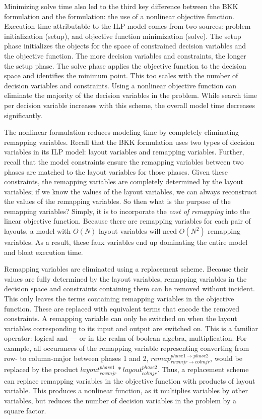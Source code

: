 Minimizing solve time also led to the third key difference between the BKK formulation and the \FormatDecisions{} formulation: the use of a nonlinear objective function.
Execution time attributable to the ILP model comes from two sources: problem initialization (setup), and objective function minimization (solve).
The setup phase initializes the objects for the space of constrained decision variables and the objective function.
The more decision variables and constraints, the longer the setup phase.
The solve phase applies the objective function to the decision space and identifies the minimum point.
This too scales with the number of decision variables and constraints.
Using a nonlinear objective function can eliminate the majority of the decision variables in the problem.
While search time per decision variable increases with this scheme, the overall model time decreases significantly.

The nonlinear formulation reduces modeling time by completely eliminating remapping variables.
Recall that the BKK formulation uses two types of decision variables in its ILP model: layout variables and remapping variables.
Further, recall that the model constraints ensure the remapping variables between two phases are matched to the layout variables for those phases.
Given these constraints, the remapping variables are completely determined by the layout variables; 
if we know the values of the layout variables, we can always reconstruct the values of the remapping variables.
So then what is the purpose of the remapping variables? 
Simply, it is to incorporate the \textit{cost of remapping} into the linear objective function.
Because there are remapping variables for each pair of layouts, a model with $O(N)$ layout variables will need $O(N^2)$ remapping variables.
As a result, these faux variables end up dominating the entire model and bloat execution time.

Remapping variables are eliminated using a replacement scheme. 
Because their values are fully determined by the layout variables, remapping variables in the decision space and constraints containing them can be removed without incident.
This only leaves the terms containing remapping variables in the objective function.
These are replaced with equivalent terms that encode the removed constraints.
A remapping variable can only be switched on when the layout variables corresponding to its input and output are switched on.
This is a familiar operator: logical and --- or in the realm of boolean algebra, multiplication.
For example, all occurances of the remapping variable representing converting from row- to column-major between phases 1 and 2, $remap_{rowmjr \rightarrow colmjr}^{phase1 \rightarrow phase2}$, would be replaced by the product $layout_{rowmjr}^{phase1} * layout_{colmjr}^{phase2}$.
Thus, a replacement scheme can replace remapping variables in the objective function with products of layout variable.
This produces a nonlinear function, as it multiplies variables by other variables, but reduces the number of decision variables in the problem by a square factor.

